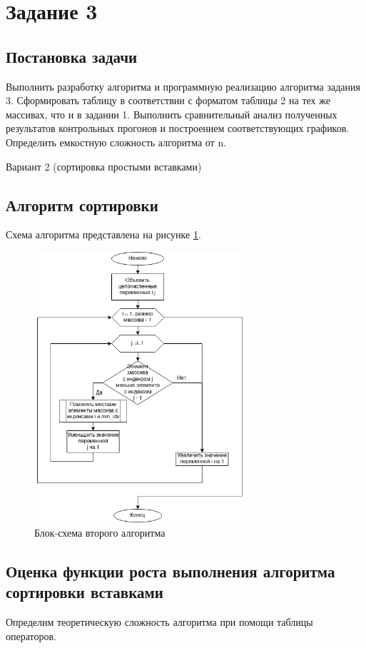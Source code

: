 \documentclass[14pt]{extarticle}
\begin{document}
\section{Задание 3}
\subsection{Постановка задачи}
Выполнить разработку алгоритма и программную реализацию
алгоритма задания 3. Сформировать таблицу в соответствии с форматом
таблицы 2 на тех же массивах, что и в задании 1. Выполнить сравнительный
анализ полученных результатов контрольных прогонов и построением
соответствующих графиков. Определить емкостную сложность алгоритма от
n.

Вариант 2 (сортировка простыми вставками)
\subsection{Алгоритм сортировки}
Схема алгоритма представлена на рисунке \ref{fig:second_alg_scheme}.

\begin{figure}[htpb]
  \centering
  \includegraphics[width=0.7\textwidth]{pictures/task_3.png}
  \caption{Блок-схема второго алгоритма}
  \label{fig:second_alg_scheme}
\end{figure}
\newpage

\subsection{Оценка функции роста выполнения алгоритма сортировки вставками}
Определим теоретическую сложность алгоритма при помощи таблицы
операторов.
\end{document}
